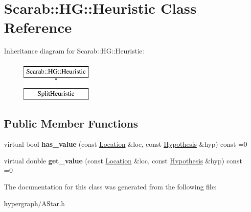 \hypertarget{class_scarab_1_1_h_g_1_1_heuristic}{
\section{Scarab::HG::Heuristic Class Reference}
\label{class_scarab_1_1_h_g_1_1_heuristic}
}
Inheritance diagram for Scarab::HG::Heuristic:\begin{figure}[H]
\begin{center}
\leavevmode
\includegraphics[height=2cm]{class_scarab_1_1_h_g_1_1_heuristic}
\end{center}
\end{figure}
\subsection*{Public Member Functions}
\begin{DoxyCompactItemize}
\item 
\hypertarget{class_scarab_1_1_h_g_1_1_heuristic_afad5a99d38b6783521e4c670d3edcf0a}{
virtual bool {\bfseries has\_\-value} (const \hyperlink{struct_scarab_1_1_h_g_1_1_location}{Location} \&loc, const \hyperlink{struct_scarab_1_1_h_g_1_1_hypothesis}{Hypothesis} \&hyp) const =0}
\label{class_scarab_1_1_h_g_1_1_heuristic_afad5a99d38b6783521e4c670d3edcf0a}

\item 
\hypertarget{class_scarab_1_1_h_g_1_1_heuristic_aca6b5924257b35be9e65058062fdc0d5}{
virtual double {\bfseries get\_\-value} (const \hyperlink{struct_scarab_1_1_h_g_1_1_location}{Location} \&loc, const \hyperlink{struct_scarab_1_1_h_g_1_1_hypothesis}{Hypothesis} \&hyp) const =0}
\label{class_scarab_1_1_h_g_1_1_heuristic_aca6b5924257b35be9e65058062fdc0d5}

\end{DoxyCompactItemize}


The documentation for this class was generated from the following file:\begin{DoxyCompactItemize}
\item 
hypergraph/AStar.h\end{DoxyCompactItemize}
